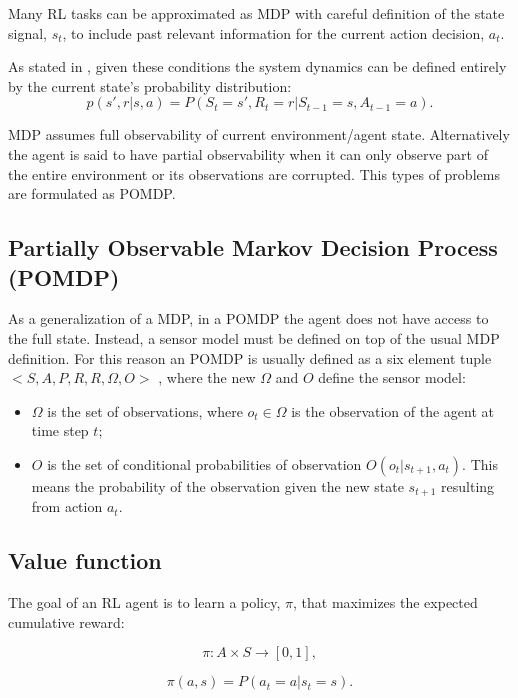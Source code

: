 Many \acrshort{RL} tasks can be approximated as \acrshort{MDP} with careful definition of the state signal, $s_t$, to include past relevant information for the current action decision, $a_t$.

As stated in \cite{RLbook}, given these conditions the system dynamics can be defined entirely by the current state's probability distribution:
\begin{equation}
p(s', r|s, a) = P(S_t=s', R_t=r|S_{t-1}=s, A_{t-1}=a).
\end{equation}

\acrshort{MDP} assumes full observability of current environment/agent state. Alternatively the agent is said to have partial observability when it can only observe part of the entire environment or its observations are corrupted. This types of problems are formulated as \acrfull{POMDP}.

\subsection{Partially Observable Markov Decision Process (POMDP)}
\noindent As a generalization of a \acrshort{MDP}, in a \acrshort{POMDP} the agent does not have access to the full state. Instead, a sensor model must be defined on top of the usual \acrshort{MDP} definition. For this reason an \acrshort{POMDP} is usually defined as a six element tuple $<S, A, P, R, R, \Omega, O>$ \cite{POMP}, where the new $\Omega$ and $O$ define the sensor model:
\begin{itemize}
    \item $\Omega$ is the set of observations, where $o_t \in \Omega$ is the observation of the agent at time step $t$;
    \item $O$ is the set of conditional probabilities of observation $O(o_{t}|s_{t+1},a_t)$. This means the probability of the observation given the new state $s_{t+1}$ resulting from action $a_t$.
\end{itemize}
\subsection{Value function}
\noindent The goal of an \acrshort{RL} agent is to learn a policy, $\pi$, that maximizes the expected cumulative reward:

\begin{equation}
\pi:A \times S \rightarrow [0, 1],
\end{equation}

\begin{equation} \label{policy_func}
\pi(a, s) = P(a_t=a|s_t=s).
\end{equation}

